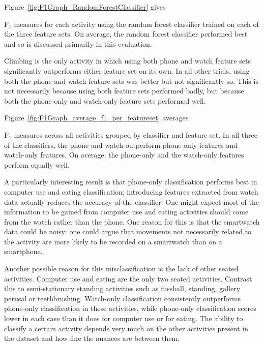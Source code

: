     Figure~\ref{fig:F1Graph_RandomForestClassifier} gives {$\mathrm{F}_1$ measures for each activity using the random forest classifier trained on each of the three feature sets. On average, the random forest classifier performed best and so is discussed primarily in this evaluation.
    
    Climbing is the only activity in which using both phone and watch feature sets significantly outperforms either feature set on its own. In all other trials, using both the phone and watch feature sets was better but not significantly so. This is not necessarily because using both feature sets performed badly, but because both the phone-only and watch-only feature sets performed well. 
  
    Figure~\ref{fig:F1Graph_average_f1_per_featureset} averages {$\mathrm{F}_1$ measures across all activities grouped by classifier and feature set. In all three of the classifiers, the phone and watch outperform phone-only features and watch-only features. On average, the phone-only and the watch-only features perform equally well.
    
    A particularly interesting result is that phone-only classification performs best in computer use and eating classification; introducing features extracted from watch data actually reduces the accuracy of the classifier. One might expect most of the information to be gained from computer use and eating activities should come from the watch rather than the phone. One reason for this is that the smartwatch data could be noisy: one could argue that movements not necessarily related to the activity are more likely to be recorded on a smartwatch than on a smartphone.
    
    Another possible reason for this misclassification is the lack of other seated activities. Computer use and eating are the only two seated activities. Contrast this to semi-stationary standing activities such as fussball, standing, gallery perusal or teethbrushing. Watch-only classification consistently outperforms phone-only classification in these activities, while phone-only classification scores lower in each case than it does for computer use or for eating. The ability to classify a certain activity depends very much on the other activities present in the dataset and how fine the nuances are between them. 
    
}}
